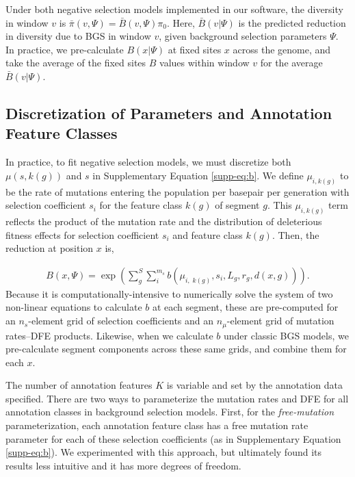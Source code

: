 \documentclass[11pt]{article}
\begin{document}
Under both negative selection models implemented in our software, the diversity
in window $v$ is $\bar{\pi}(v, \Psi) = \bar{B}(v, \Psi) \pi_0$. Here,
$\bar{B}(v | \Psi)$ is the predicted reduction in diversity due to BGS in
window $v$, given background selection parameters $\Psi$. In practice, we
pre-calculate $B(x | \Psi)$ at fixed sites $x$ across the genome, and take the
average of the fixed sites $B$ values within window $v$ for the average
$\bar{B}(v | \Psi)$. 

\subsection{Discretization of Parameters and Annotation Feature Classes}

In practice, to fit negative selection models, we must discretize both $\mu(s,
k(g))$ and $s$ in Supplementary Equation \eqref{supp-eq:b}. We define
$\mu_{i,k(g)}$ to be the rate of mutations entering the population per basepair
per generation with selection coefficient $s_i$ for the feature class $k(g)$ of
segment $g$. This $\mu_{i, k(g)}$ term reflects the product of the mutation
rate and the distribution of deleterious fitness effects for selection
coefficient $s_i$ and feature class $k(g)$. Then, the reduction at position $x$
is,

\begin{align}
  \label{supp-eq:b-disc}
  B(x, \Psi) = \exp \left( \sum_g^S \sum_{i}^{m_s} b(\mu_{i, \;k(g)}, s_i, L_g, r_g, d(x, g))\right).
\end{align}
%
Because it is computationally-intensive to numerically solve the system of two
non-linear equations to calculate $b$ at each segment, these are pre-computed
for an $n_s$-element grid of selection coefficients and an $n_\mu$-element grid
of mutation rates--DFE products. Likewise, when we calculate $b$ under classic
BGS models, we pre-calculate segment components across these same grids, and
combine them for each $x$.

The number of annotation features $K$ is variable and set by the annotation
data specified. There are two ways to parameterize the mutation rates and DFE
for all annotation classes in background selection models. First, for the
\emph{free-mutation} parameterization, each annotation feature class has a free
mutation rate parameter for each of these selection coefficients (as in
Supplementary Equation \ref{supp-eq:b}). We experimented with this approach,
but ultimately found its results less intuitive and it has more degrees of
freedom.
\end{document}
